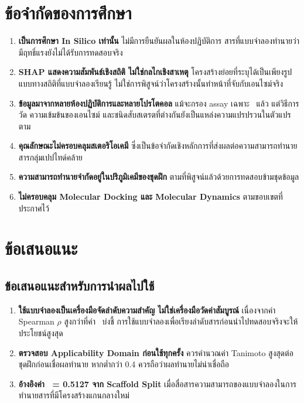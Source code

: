 \section{ข้อจำกัดของการศึกษา}

\begin{enumerate}[leftmargin=2em, itemsep=0.4em]
  \item \textbf{เป็นการศึกษา In Silico เท่านั้น} ไม่มีการยืนยันผลในห้องปฏิบัติการ สารที่แบบจำลองทำนายว่ามีฤทธิ์แรงยังไม่ได้รับการทดสอบจริง
  \item \textbf{SHAP แสดงความสัมพันธ์เชิงสถิติ ไม่ใช่กลไกเชิงสาเหตุ} โครงสร้างย่อยที่ระบุได้เป็นเพียงรูปแบบทางสถิติที่แบบจำลองเรียนรู้ ไม่ใช่การพิสูจน์ว่าโครงสร้างนั้นทำหน้าที่จับกับเอนไซม์จริง
  \item \textbf{ข้อมูลมาจากหลายห้องปฏิบัติการและหลายโปรโตคอล} แม้จะกรอง assay เฉพาะ \CLpro\ แล้ว แต่วิธีการวัด ความเข้มข้นของเอนไซม์ และชนิดสับสเตรตที่ต่างกันยังเป็นแหล่งความแปรปรวนในตัวแปรตาม
  \item \textbf{คุณลักษณะไม่ครอบคลุมสเตอริโอเคมี} ซึ่งเป็นข้อจำกัดเชิงหลักการที่ส่งผลต่อความสามารถทำนายสารกลุ่มเปปไทด์คล้าย
  \item \textbf{ความสามารถทำนายจำกัดอยู่ในปริภูมิเคมีของชุดฝึก} ตามที่พิสูจน์แล้วด้วยการทดสอบข้ามชุดข้อมูล
  \item \textbf{ไม่ครอบคลุม Molecular Docking และ Molecular Dynamics} ตามขอบเขตที่ประกาศไว้
\end{enumerate}

\section{ข้อเสนอแนะ}

\subsection{ข้อเสนอแนะสำหรับการนำผลไปใช้}

\begin{enumerate}[leftmargin=2em, itemsep=0.4em]
  \item \textbf{ใช้แบบจำลองเป็นเครื่องมือจัดลำดับความสำคัญ ไม่ใช่เครื่องมือวัดค่าสัมบูรณ์} เนื่องจากค่า Spearman $\rho$ สูงกว่าที่ค่า \Rsq\ บ่งชี้ การใช้แบบจำลองเพื่อเรียงลำดับสารก่อนนำไปทดสอบจริงจะให้ประโยชน์สูงสุด
  \item \textbf{ตรวจสอบ Applicability Domain ก่อนใช้ทุกครั้ง} ควรคำนวณค่า Tanimoto สูงสุดต่อชุดฝึกก่อนเชื่อผลทำนาย หากต่ำกว่า 0.4 ควรถือว่าผลทำนายไม่น่าเชื่อถือ
  \item \textbf{อ้างอิงค่า \Rsq\ = 0.5127 จาก Scaffold Split} เมื่อสื่อสารความสามารถของแบบจำลองในการทำนายสารที่มีโครงสร้างแกนกลางใหม่
\end{enumerate}

